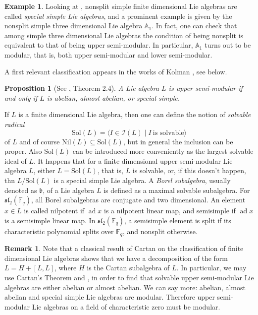 \documentclass{amsart}
\newtheorem{proposition}[theorem]{Proposition}
\theoremstyle{definition}
\newtheorem{remark}[theorem]{Remark}
\newtheorem{example}[theorem]{Example}
\numberwithin{equation}{section}
\begin{document}
\begin{example} Looking at \cite{elduque1, elduque2, strade1}, nonsplit simple finite dimensional Lie algebras are called  \textit{special simple Lie algebras}, and a prominent example is given by the nonsplit simple three dimensional  Lie algebra $\mathbb{A}_1$. In fact, one can check that among simple three dimensional Lie algebras the condition of being nonsplit is equivalent to that of being upper semi-modular. In particular,  $\mathbb{A}_1$ turns out to be  modular, that is, both upper semi-modular and lower semi-modular.\end{example}  

A first relevant classification appears in the works of Kolman \cite{kolman1965}, see below.

\begin{proposition}[See \cite{kolman1965}, Theorem 2.4] A Lie algebra $L$ is upper semi-modular if and only if $L$ is abelian, almost abelian, or special simple.
\end{proposition}


If $L$ is a finite dimensional  Lie algebra, then one can define the  notion of  \textit{solvable radical}  $$\mathrm{Sol}(L)=\langle I \in \mathcal{I}(L) \mid I \ \mbox{is solvable}\rangle$$
of $L$ and of course  $\mathrm{Nil}(L) \subseteq \mathrm{Sol}(L)$, but in general the inclusion can be proper. Also $\mathrm{Sol}(L)$ can be introduced more conveniently as the  largest solvable ideal of $L$. It happens that for a finite dimensional upper semi-modular Lie algebra $L$,  either $ L=\mathrm{Sol}(L)$, that  is, $L$ is solvable, or, if this doesn't happen, thn $L/\mathrm{Sol}(L)$ is a special simple Lie algebra. 
A \textit{Borel subalgebra}, usually denoted as \(\mathfrak{b}\), of a Lie algebra $L$ is defined as a maximal solvable subalgebra. 
For $\mathfrak{sl}_2(\mathbb{F}_q)$, all Borel subalgebras are conjugate and two dimensional. An element $x \in L$ is called nilpotent if $\operatorname{ad} x$ is a nilpotent linear map, and semisimple if $\operatorname{ad} x$ is a semisimple linear map. In $\mathfrak{sl}_2(\mathbb{F}_q)$, a semisimple element is split if its characteristic polynomial splits over $\mathbb{F}_q$, and nonsplit otherwise.


\begin{remark}Note that a classical result of Cartan \cite{strade1} on the classification of finite dimensional Lie algebras shows that we  have a decomposition of the form $L= H + [L,L]$, where $H$ is the Cartan subalgebra of $L$. In particular, we may use Cartan's Theorem and  \cite [Theorem 2.3] {kolman1965}, in order to find that  solvable upper semi-modular Lie algebras are either  abelian or almost abelian.  We can say more: abelian, almost abelian and special simple Lie algebras are  modular. Therefore  upper semi-modular Lie algebras on a field of characteristic zero must be modular. \end{remark}
\end{document}
